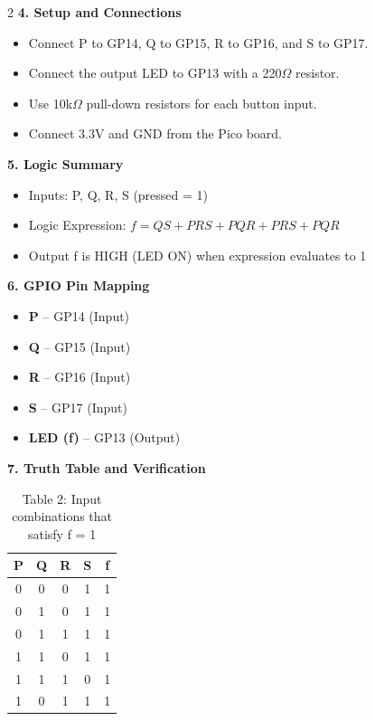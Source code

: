 \documentclass[12pt]{article}
\begin{document}
\begin{multicols}{2}
\vspace{1em}
\noindent\textbf{4. Setup and Connections}
\begin{itemize}
    \item Connect P to GP14, Q to GP15, R to GP16, and S to GP17.
    \item Connect the output LED to GP13 with a 220$\Omega$ resistor.
    \item Use 10k$\Omega$ pull-down resistors for each button input.
    \item Connect 3.3V and GND from the Pico board.
\end{itemize}

\vspace{1em}
\noindent\textbf{5. Logic Summary}
\begin{itemize}
    \item Inputs: P, Q, R, S (pressed = 1)
    \item Logic Expression: $f = QS + PRS + PQR + PRS + PQR$
    \item Output f is HIGH (LED ON) when expression evaluates to 1
\end{itemize}

\vspace{1em}
\noindent\textbf{6. GPIO Pin Mapping}
\begin{itemize}
    \item \textbf{P} – GP14 (Input)
    \item \textbf{Q} – GP15 (Input)
    \item \textbf{R} – GP16 (Input)
    \item \textbf{S} – GP17 (Input)
    \item \textbf{LED (f)} – GP13 (Output)
\end{itemize}

\vspace{1em}
\noindent\textbf{7. Truth Table and Verification}
\begin{table}[H]
\centering
\small
\begin{tabular}{|c|c|c|c|c|}
\hline
P & Q & R & S & f \\
\hline
0 & 0 & 0 & 1 & 1 \\
0 & 1 & 0 & 1 & 1 \\
0 & 1 & 1 & 1 & 1 \\
1 & 1 & 0 & 1 & 1 \\
1 & 1 & 1 & 0 & 1 \\
1 & 0 & 1 & 1 & 1 \\
\hline
\end{tabular}
\caption*{Table 2: Input combinations that satisfy f = 1}
\end{table}


\end{multicols}
\end{document}
